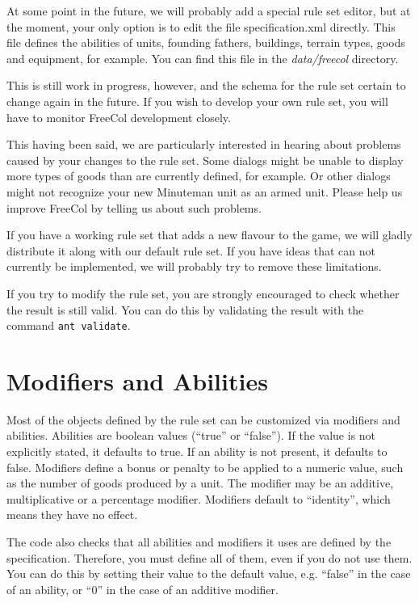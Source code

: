 \documentclass[12pt]{book}
\begin{document}
At some point in the future, we will probably add a special rule set
editor, but at the moment, your only option is to edit the file
specification.xml directly. This file defines the abilities of units,
founding fathers, buildings, terrain types, goods and equipment, for
example. You can find this file in the \textit{data/freecol} directory.

This is still work in progress, however, and the schema for the rule
set certain to change again in the future. If you wish to develop your
own rule set, you will have to monitor FreeCol development closely.

This having been said, we are particularly interested in hearing about
problems caused by your changes to the rule set. Some dialogs might be
unable to display more types of goods than are currently defined, for
example. Or other dialogs might not recognize your new Minuteman unit
as an armed unit. Please help us improve FreeCol by telling us about
such problems.

If you have a working rule set that adds a new flavour to the game, we
will gladly distribute it along with our default rule set. If you have
ideas that can not currently be implemented, we will probably try to
remove these limitations.

If you try to modify the rule set, you are strongly encouraged to
check whether the result is still valid. You can do this by validating
the result with the command \verb$ant validate$.


\hypertarget{Modifiers and Abilities}{\section{Modifiers and Abilities}}

Most of the objects defined by the rule set can be customized via
modifiers and abilities.  Abilities are boolean values (``true'' or
``false''). If the value is not explicitly stated, it defaults to
true. If an ability is not present, it defaults to false. Modifiers
define a bonus or penalty to be applied to a numeric value, such as
the number of goods produced by a unit. The modifier may be an
additive, multiplicative or a percentage modifier. Modifiers default
to ``identity'', which means they have no effect.

The code also checks that all abilities and modifiers it uses are
defined by the specification. Therefore, you must define all of them,
even if you do not use them. You can do this by setting their value to
the default value, e.g. ``false'' in the case of an ability, or ``0''
in the case of an additive modifier.
\end{document}
